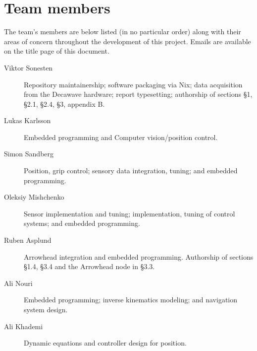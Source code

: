 \section{Team members}
The team's members are below listed (in no particular order) along with their areas of concern throughout the development of this project.
Emails are available on the title page of this document.

\begin{description}
\item[Viktor Sonesten] Repository maintainership; software packaging
  via Nix; data acquisition from the Decawave hardware; report
  typesetting; authorship of sections §1, §2.1, §2.4, §3, appendix B.

    \item[Lukas Karlsson]
    Embedded programming and
    Computer vision/position control.

    \item[Simon Sandberg]
    Position, grip control;
    sensory data integration, tuning; and
    embedded programming.

    \item[Oleksiy Mishchenko]
    Sensor implementation and tuning;
    implementation, tuning of control systems; and
    embedded programming.

    \item[Ruben Asplund]
    Arrowhead integration and embedded programming.
    Authorship of sections §1.4, §3.4 and the Arrowhead node in §3.3.

    \item[Ali Nouri]
    Embedded programming;
    inverse kinematics modeling; and
    navigation system design.

    \item[Ali Khademi]
    Dynamic equations and controller design for position.
\end{description}


